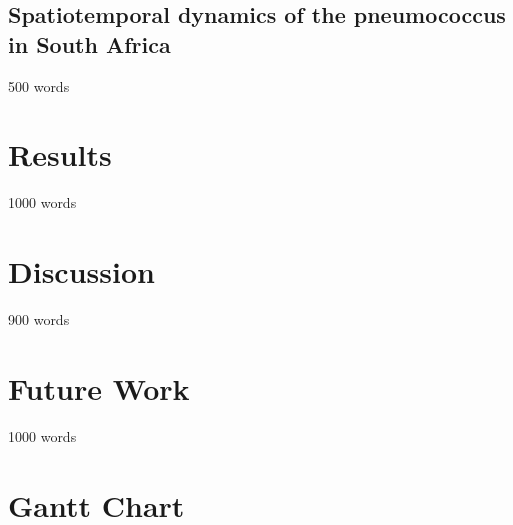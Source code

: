 \documentclass{article}
\begin{document}
\subsection{Spatiotemporal dynamics of the pneumococcus in South Africa}
500 words
\section{Results}
1000 words
\section{Discussion}
900 words
\section{Future Work}
1000 words
\section{Gantt Chart}
\printbibliography
\end{document}
